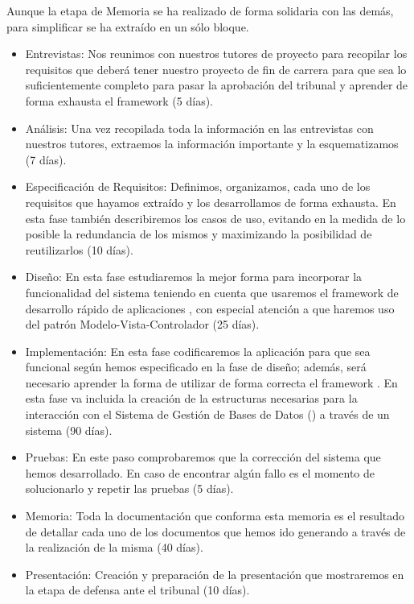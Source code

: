 Aunque la etapa de Memoria se ha realizado de forma solidaria con las demás,
para simplificar se ha extraído en un sólo bloque.

\begin{itemize}
\item Entrevistas: Nos reunimos con nuestros tutores de proyecto para recopilar
  los requisitos que deberá tener nuestro proyecto de fin de carrera para que
  sea lo suficientemente completo para pasar la aprobación del tribunal y
  aprender de forma exhausta el framework  (5 días).
\item Análisis: Una vez recopilada toda la información en las entrevistas con
  nuestros tutores, extraemos la información importante y la esquematizamos (7
  días).
\item Especificación de Requisitos: Definimos, organizamos, cada uno de los
  requisitos que hayamos extraído y los desarrollamos de forma exhausta. En esta
  fase también describiremos los casos de uso, evitando en la medida de lo
  posible la redundancia de los mismos y maximizando la posibilidad de
  reutilizarlos (10 días).
\item Diseño: En esta fase estudiaremos la mejor forma para incorporar la
  funcionalidad del sistema teniendo en cuenta que usaremos el framework de
  desarrollo rápido de aplicaciones , con especial
  atención a que haremos uso del patrón Modelo-Vista-Controlador (25 días).
\item Implementación: En esta fase codificaremos la aplicación para que sea
  funcional según hemos especificado en la fase de diseño; además, será
  necesario aprender la forma de utilizar de forma correcta el framework
  . En esta fase va incluida la creación de la
  estructuras necesarias para la interacción con el Sistema de Gestión de Bases
  de Datos () a través de un sistema  (90 días).
\item Pruebas: En este paso comprobaremos que la corrección del sistema que
  hemos desarrollado. En caso de encontrar algún fallo es el momento de
  solucionarlo y repetir las pruebas (5 días).
\item Memoria: Toda la documentación que conforma esta memoria es el resultado
  de detallar cada uno de los documentos que hemos ido generando a través de la
  realización de la misma (40 días).
\item Presentación: Creación y preparación de la presentación que mostraremos en
  la etapa de defensa ante el tribunal (10 días).
\end{itemize}
\clearpage

